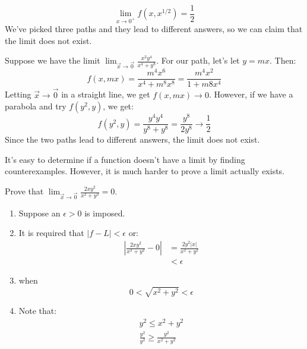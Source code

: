 \begin{itemize}
\begin{example}
\begin{equation}
            \lim_{x\to 0^+} f(x,x^{1/2}) = \frac{1}{2}
        \end{equation}
        We've picked three paths and they lead to different answers, so we can claim that the limit does not exist.
    \end{example}
    \begin{example}
        Suppose we have the limit $\lim_{\vec{x}\to \vec{0}} \frac{x^2y^4}{x^4+y^8}$. For our path, let's let $y=mx$. Then:
        \begin{equation}
            f(x,mx) = \frac{m^4x^6}{x^4+m^8x^8} = \frac{m^4x^2}{1+m8x^4}
        \end{equation}
        Letting $\vec{x}\to\vec{0}$ in a straight line, we get $f(x,mx)\to 0$. However, if we have a parabola and try $f(y^2,y)$, we get:
        \begin{equation}
            f(y^2,y)=\frac{y^4y^4}{y^8+y^8} = \frac{y^8}{2y^8} \to \frac{1}{2}
        \end{equation}
        Since the two paths lead to different answers, the limit does not exist.
    \end{example}
    \begin{warning}
        It's easy to determine if a function doesn't have a limit by finding counterexamples. However, it is much harder to prove a limit actually exists.
    \end{warning}
    \begin{example}
        Prove that $\lim_{\vec{x}\to\vec{0}} \frac{2xy^2}{x^2+y^2}=0$.
        \begin{enumerate}
            \item Suppose an $\epsilon > 0$ is imposed.
            \item It is required that $|f-L|<\epsilon$ or:
            \begin{align}
                \left|\frac{2xy^2}{x^2+y^2} - 0\right| &= \frac{2y^2|x|}{x^2+y^2} \\ &<\epsilon
            \end{align}
            \item when 
            \begin{equation}
                0 < \sqrt{x^2+y^2} < \epsilon
            \end{equation}
            \item Note that:
            \begin{align}
                y^2 \le x^2 + y^2 \\ 
                \frac{y^2}{y^2} \ge \frac{y^2}{x^2+y^2} \\ 

\end{align}
\end{enumerate}
\end{example}
\end{itemize}
